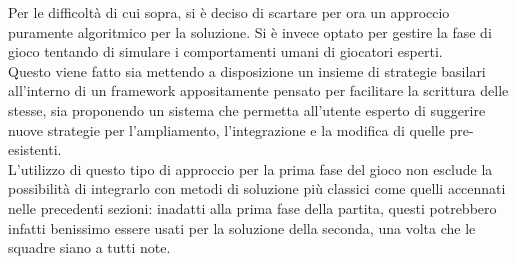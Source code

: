 Per le difficoltà di cui sopra, si è deciso di scartare per ora un approccio puramente algoritmico per la soluzione.
Si è invece optato per gestire la fase di gioco tentando di simulare i comportamenti umani di giocatori esperti.\\
Questo viene fatto sia mettendo a disposizione un insieme di strategie basilari all'interno di un framework appositamente pensato per facilitare la scrittura delle stesse, sia proponendo un sistema che permetta all'utente esperto di suggerire nuove strategie per l'ampliamento, l'integrazione e la modifica di quelle pre-esistenti.\\
L'utilizzo di questo tipo di approccio per la prima fase del gioco non esclude la possibilità di integrarlo con metodi di soluzione più classici come quelli accennati nelle precedenti sezioni: inadatti alla prima fase della partita, questi potrebbero infatti benissimo essere usati per la soluzione della seconda, una volta che le squadre siano a tutti note.
